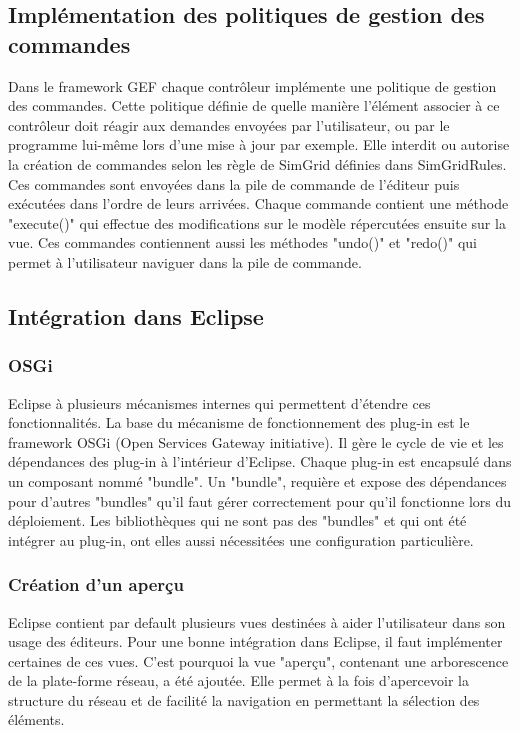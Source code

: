 \documentclass{article}
\begin{document}
    \subsection{Implémentation des politiques de gestion des commandes}
    	Dans le framework GEF chaque contrôleur implémente une politique de gestion des commandes. Cette politique définie de quelle manière l'élément associer à ce contrôleur doit réagir aux demandes envoyées par l'utilisateur, ou par le programme lui-même lors d'une mise à jour par exemple. Elle interdit ou autorise la création de commandes selon les règle de SimGrid définies dans SimGridRules. Ces commandes sont envoyées dans la pile de commande de l'éditeur puis exécutées dans l'ordre de leurs arrivées. Chaque commande contient une méthode "execute()" qui effectue des modifications sur le modèle répercutées ensuite sur la vue. Ces commandes contiennent aussi les méthodes "undo()" et "redo()" qui permet à l'utilisateur naviguer dans la pile de commande.
    \subsection{Intégration dans Eclipse}
    	\subsubsection{OSGi}
    	Eclipse à plusieurs mécanismes internes qui permettent d'étendre ces fonctionnalités. La base du mécanisme de fonctionnement des plug-in est le framework OSGi (Open Services Gateway initiative). Il gère le cycle de vie et les dépendances des plug-in à l'intérieur d'Eclipse. Chaque plug-in est encapsulé dans un composant nommé "bundle". Un "bundle", requière et expose des dépendances pour d'autres "bundles" qu'il faut gérer correctement pour qu'il fonctionne lors du déploiement. Les bibliothèques qui ne sont pas des "bundles" et qui ont été intégrer au plug-in, ont elles aussi nécessitées une configuration particulière.
        \subsubsection{Création d'un aperçu}
        Eclipse contient par default plusieurs vues destinées à aider l'utilisateur dans son usage des éditeurs. Pour une bonne intégration dans Eclipse, il faut implémenter certaines de ces vues. C'est pourquoi la vue "aperçu", contenant une arborescence de la plate-forme réseau, a été ajoutée. Elle permet à la fois d'apercevoir la structure du réseau et de facilité la navigation en permettant la sélection des éléments.
\end{document}
